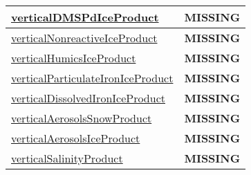 {\begin{center}
\begin{longtable}{| p{2.0in} | p{4.0in} |}
    \hline
    \hyperref[subsec:var_sec_tracer_products_verticalDMSPdIceProduct]{verticalDMSPdIceProduct} & {\bf \color{red} MISSING} \\
    \hline
    \hyperref[subsec:var_sec_tracer_products_verticalNonreactiveIceProduct]{verticalNonreactiveIceProduct} & {\bf \color{red} MISSING} \\
    \hline
    \hyperref[subsec:var_sec_tracer_products_verticalHumicsIceProduct]{verticalHumicsIceProduct} & {\bf \color{red} MISSING} \\
    \hline
    \hyperref[subsec:var_sec_tracer_products_verticalParticulateIronIceProduct]{verticalParticulateIronIceProduct} & {\bf \color{red} MISSING} \\
    \hline
    \hyperref[subsec:var_sec_tracer_products_verticalDissolvedIronIceProduct]{verticalDissolvedIronIceProduct} & {\bf \color{red} MISSING} \\
    \hline
    \hyperref[subsec:var_sec_tracer_products_verticalAerosolsSnowProduct]{verticalAerosolsSnowProduct} & {\bf \color{red} MISSING} \\
    \hline
    \hyperref[subsec:var_sec_tracer_products_verticalAerosolsIceProduct]{verticalAerosolsIceProduct} & {\bf \color{red} MISSING} \\
    \hline
    \hyperref[subsec:var_sec_tracer_products_verticalSalinityProduct]{verticalSalinityProduct} & {\bf \color{red} MISSING} \\
    \hline
\end{longtable}
\end{center}
}
